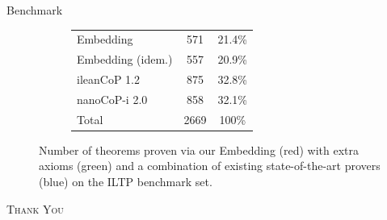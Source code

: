 \documentclass{cubeamer}
\begin{document}
	\begin{frame}{Benchmark}
		
		\begin{figure}
			\begin{subfigure}[8]{0.4\textwidth}
				\def\firstcircle{(90:.75) circle (1.5)}
				\def\secondcircle{(210:.75) circle (1.5)}
				\def\thirdcircle{(330:.75) circle (1.5)}
			\end{subfigure}
			\begin{subfigure}[8]{0.4\textwidth}
				\vspace*{-.5cm}
				\begin{tabular}{l|c|c}
					Embedding&571&21.4\%\\
					Embedding (idem.)&557&20.9\%\\
					ileanCoP 1.2&875&32.8\%\\
					nanoCoP-i 2.0&858&32.1\%\\\hline
					Total&2669&100\%
				\end{tabular}
			\end{subfigure}
			\vfill
			\caption{Number of theorems proven via our Embedding (red) with extra axioms (green) and a combination of existing state-of-the-art provers (blue) on the ILTP benchmark set.}
		\end{figure}
	\end{frame}
	
\begin{frame}[standout]
	\Huge\textsc{Thank You}
\end{frame}
	
\end{document}
